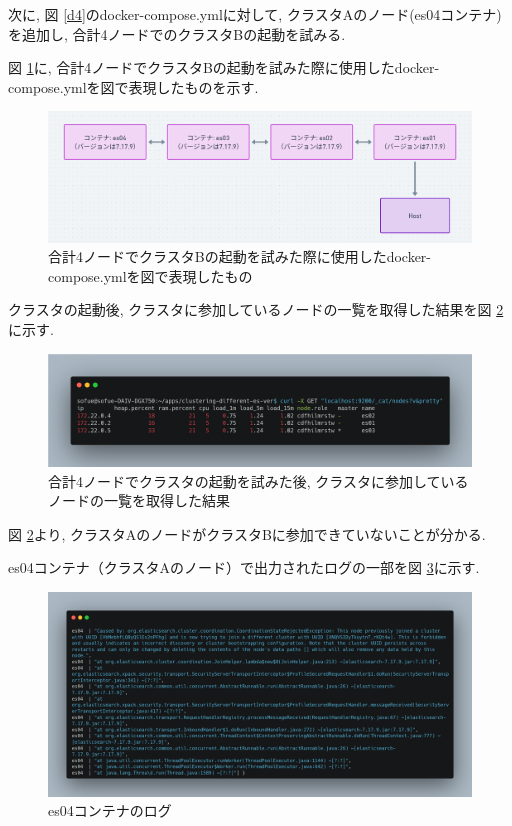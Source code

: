 次に, 図 \ref{d4}のdocker-compose.ymlに対して, クラスタAのノード(es04コンテナ)を追加し, 合計4ノードでのクラスタBの起動を試みる.

図 \ref{d5}に, 合計4ノードでクラスタBの起動を試みた際に使用したdocker-compose.ymlを図で表現したものを示す.

\begin{figure}[h]
  \begin{center}
    \includegraphics[width=160mm]{sotu/figure/4-7.17.9.png}
    \caption{合計4ノードでクラスタBの起動を試みた際に使用したdocker-compose.ymlを図で表現したもの}
    \label{d5}
  \end{center}
\end{figure}

クラスタの起動後, クラスタに参加しているノードの一覧を取得した結果を図 \ref{p3-1}に示す.

\begin{figure}[h]
  \begin{center}
    \includegraphics[width=160mm]{sotu/figure/4nodes-list.png}
    \caption{合計4ノードでクラスタの起動を試みた後, クラスタに参加しているノードの一覧を取得した結果}
    \label{p3-1}
  \end{center}
\end{figure}

図 \ref{p3-1}より, クラスタAのノードがクラスタBに参加できていないことが分かる.

es04コンテナ（クラスタAのノード）で出力されたログの一部を図 \ref{p3-2}に示す.

\begin{figure}[h]
  \begin{center}
    \includegraphics[width=160mm]{sotu/figure/es04-log.png}
    \caption{es04コンテナのログ}
    \label{p3-2}
  \end{center}
\end{figure}

